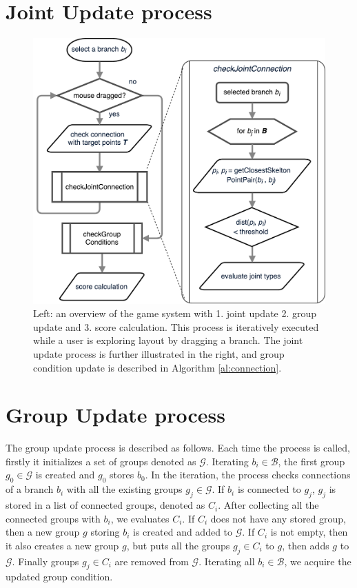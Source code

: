 \documentclass[review]{acmsiggraph}
\begin{document}
 \section{Joint Update process}
 \begin{figure}[h]
 	\begin{center}
 		\includegraphics[width = 0.35\paperwidth]{images/system/closestPointAlgorithm.pdf}
 		\caption{Left: an overview of the game system with 1. joint update 2. group update and 3. score calculation. This process is iteratively executed while a user is exploring layout by dragging a branch. The joint update process is further illustrated in the right, and group condition update is described in Algorithm \ref{al:connection}. }
 		\label{fig:system_flowchart}
 	\end{center}
 \end{figure}

 \section{Group Update process}
 The group update process is described as follows.
 Each time the process is called, firstly it initializes a set of groups denoted as $\mathcal{G}$.
 Iterating $b_i \in \mathcal{B}$, the first group $g_0 \in \mathcal{G}$ is created and $g_0$ stores $b_0$.
 In the iteration, the process checks connections of a branch $b_i$ with all the existing groups $ g_j \in \mathcal{G}$.
 If $b_i$ is connected to $g_j$, $g_j$ is stored in a list of connected groups, denoted as $C_i$.
 After collecting all the connected groups with $b_i$, we evaluates $C_i$.
 If $C_i$ does not have any stored group, then a new group $g$ storing $b_i$ is created and added to $\mathcal{G}$.
 If $C_i$ is not empty, then it also creates a new group $g$, but puts all the groups $g_j \in C_i$ to $g$, then adds $g$ to $\mathcal{G}$.
 Finally groups $g_j \in C_i$ are removed from $\mathcal{G}$.
 Iterating all $b_i \in \mathcal{B}$, we acquire the updated group condition.
\end{document}
